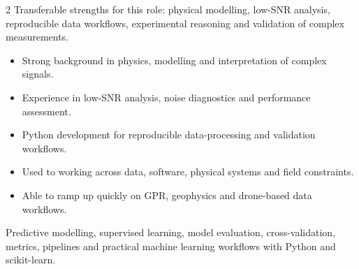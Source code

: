 \documentclass[8pt,a4paper,ragged2e,withhyper]{altacv}
\begin{document}
\begin{paracol}{2}
Transferable strengths for this role: physical modelling, low-SNR analysis, reproducible data workflows, experimental reasoning and validation of complex measurements.

\begin{itemize}
  \item Strong background in physics, modelling and interpretation of complex signals.
  \item Experience in low-SNR analysis, noise diagnostics and performance assessment.
  \item Python development for reproducible data-processing and validation workflows.
  \item Used to working across data, software, physical systems and field constraints.
  \item Able to ramp up quickly on GPR, geophysics and drone-based data workflows.
\end{itemize}


\divider
{}
\divider

\medskip



\divider


\divider


\divider




\small{
Predictive modelling, supervised learning, model evaluation, cross-validation, metrics, pipelines and practical machine learning workflows with Python and scikit-learn.
}

\divider



\end{paracol}
\end{document}
